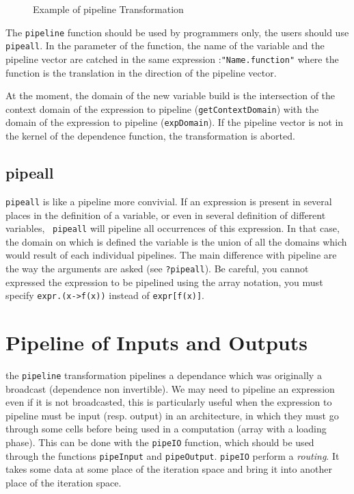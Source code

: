 \documentclass[a4paper,11pt]{article}
\begin{document}
\begin{figure}

\caption{Example of pipeline Transformation}
\label{fig0}
\end{figure}

The {\tt pipeline} function should be used by programmers only, 
the users should use {\tt pipeall}. In the parameter of 
the function, the name of the variable and the pipeline vector are catched in the 
same expression :{\tt "Name.function"} where the function is the translation
in the direction of the pipeline vector.



At the moment, the domain of the new variable build is the
intersection of the context domain of the expression to pipeline
({\tt getContextDomain}) with the domain of the expression to
pipeline ({\tt expDomain}). If the pipeline vector is not in the
kernel of the dependence function, the transformation is
aborted.

\subsection{pipeall}

{\tt pipeall} is like a pipeline more convivial. If an expression is
present in several places in the definition of a variable, or even in several
definition of different variables, {\tt
pipeall} will pipeline all occurrences of this expression.  In that
case, the domain on which is defined the variable is the union of all
the domains which would result of each individual pipelines.
The main difference with pipeline are the way the arguments are asked 
(see {\tt ?pipeall}). Be careful, you cannot expressed the expression 
to be pipelined using the array notation, you must specify 
{\tt expr.(x->f(x))} instead of {\tt expr[f(x)]}.

\section{Pipeline of Inputs and Outputs}
the {\tt pipeline} transformation pipelines a dependance which was
  originally a broadcast (dependence non invertible).  We may need to
  pipeline an expression even if it is not broadcasted, this
  is particularly useful when the expression to pipeline must be
  input (resp. output) in an architecture, in which they must go
  through some cells before being used in a computation (array with a
  loading phase).  This can be done with the {\tt pipeIO} function, which 
  should be used through the functions {\tt pipeInput} and {\tt pipeOutput}.
  {\tt pipeIO} perform a {\em routing}. It takes some data at some 
  place of the iteration space and bring it into another place of the 
  iteration space.
\end{document}
